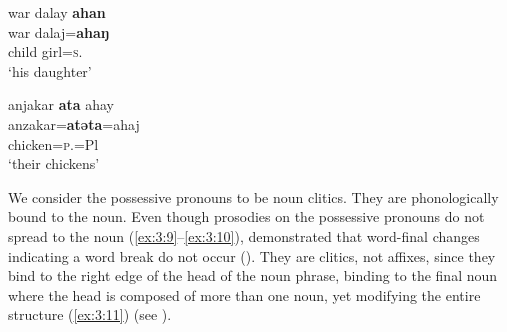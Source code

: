 \ea \label{ex:3:11}
war   dalay  \textbf{ahan}\\
\gll  war     dalaj=\textbf{ahaŋ}\\
      child  girl=\textsc{s}.{\POSS}\\
\glt  ‘his daughter’
\z

\ea \label{ex:3:12}
anjakar  \textbf{ata}  ahay\\
\gll  anzakar=\textbf{atəta}=ahaj\\
      chicken=\textsc{p}.{\POSS}=Pl\\
\glt  `their chickens’
\z

We consider the possessive pronouns to be noun clitics. They are phonologically bound to the noun. Even though prosodies on the possessive pronouns do not spread to the noun (\ref{ex:3:9}--\ref{ex:3:10}), \citet{Bow1997c} demonstrated that word-final changes indicating a word break do not occur (). They are clitics, not affixes, since they bind to the right edge of the head of the noun phrase, binding to the final noun where the head is composed of more than one noun, yet modifying the entire structure (\ref{ex:3:11})  (see ).

\begin{table}
\caption{Possessive cliticising to nouns with word-final /h/\label{tab:3.16}}
\end{table}


